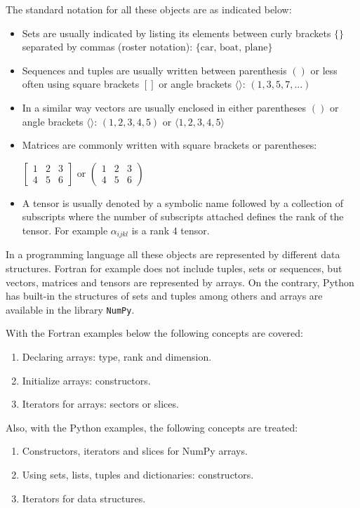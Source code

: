 The standard notation for all these objects are as indicated below:
\begin{itemize}
    \item Sets are usually indicated by listing its elements between curly brackets $\{\}$ separated by commas (roster notation): $\{\textrm{car, boat, plane}\}$
    \item Sequences and tuples are usually written between parenthesis $()$ or less often using square brackets $[]$ or angle brackets $\langle \rangle$: $(1,3,5,7,...)$
    \item In a similar way vectors are usually enclosed in either parentheses $()$ or angle brackets $\langle \rangle$: $(1,2,3,4,5)$ or $\langle1,2,3,4,5 \rangle$
    \item Matrices are commonly written with square brackets or parentheses:
    
    $
    \begin{bmatrix}
        1 & 2 & 3 \\
        4 & 5 & 6
    \end{bmatrix} 
    $ or $
    \begin{pmatrix}
        1 & 2 & 3\\
        4 & 5 & 6
    \end{pmatrix}   
    $
    \item A tensor is usually denoted by a symbolic name followed by a collection of subscripts where the number of subscripts attached defines the rank of the tensor.
    For example $\alpha_{ijkl}$ is a rank 4 tensor.
\end{itemize}

In a programming language all these objects are represented by different data structures.
Fortran for example does not include tuples, sets or sequences, but vectors, matrices and tensors are represented by arrays. 
On the contrary, Python has built-in the structures of sets and tuples among others and arrays are available in the library \texttt{NumPy}.  

With the Fortran examples below the following concepts are covered:
\begin{enumerate}[noitemsep]
    \item Declaring arrays: type, rank and dimension.
    \item Initialize arrays: constructors. 
    \item Iterators for arrays: sectors or slices. 
\end{enumerate}

Also, with the Python examples, the following concepts are treated:
\begin{enumerate}[noitemsep]
    \item Constructors, iterators and slices for NumPy arrays.
    \item Using sets, lists, tuples and dictionaries: constructors.
    \item Iterators for data structures.
\end{enumerate}





